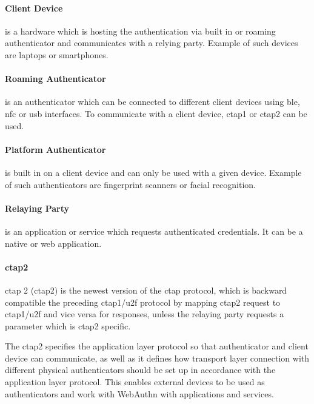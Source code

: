 \paragraph{Client Device} 
is a hardware which is hosting the authentication via built in or roaming authenticator and communicates with a relying party. Example of such devices are laptops or smartphones. 

\paragraph{Roaming Authenticator} 
is an authenticator which can be connected to different client devices using \acrshort{ble}, \acrshort{nfc} or \acrshort{usb} interfaces. To communicate with a client device, \acrshort{ctap}1 or \acrshort{ctap}2 can be used.

\paragraph{Platform Authenticator} 
is built in on a client device and can only be used with a given device. Example of such authenticators are fingerprint scanners or facial recognition.

\paragraph{Relaying Party} 
is an application or service which requests authenticated credentials. It can be a native or web application.

\paragraph{\acrshort{ctap}2}
\acrlong{ctap} 2 (\acrshort{ctap}2) is the newest version of the \acrshort{ctap} protocol, which is backward compatible the preceding \acrshort{ctap}1/\acrshort{u2f} protocol by mapping \acrshort{ctap}2 request to \acrshort{ctap}1/\acrshort{u2f} and vice versa for responses, unless the relaying party requests a parameter which is \acrshort{ctap}2 specific. 

The \acrshort{ctap}2 specifies the application layer protocol so that authenticator and client device can communicate, as well as it defines how transport layer connection with different physical authenticators should be set up in accordance with the application layer protocol. This enables external devices to be used as authenticators and work with WebAuthn with applications and services.

